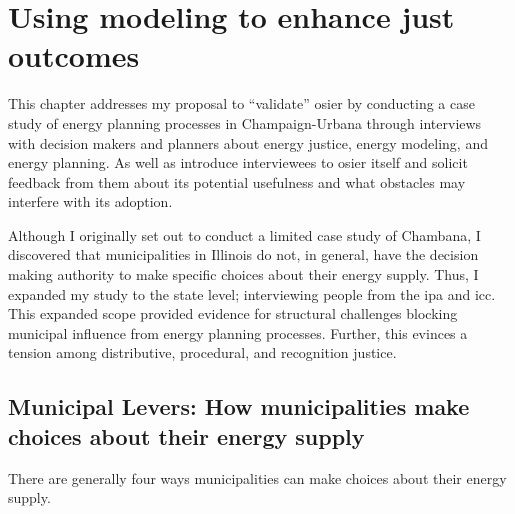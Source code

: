 





\chapter{Using modeling to enhance just outcomes}
\iffalse


This chapter addresses my proposal to ``validate'' \ac{osier} by conducting a
case study of energy planning processes in Champaign-Urbana through interviews
with decision makers and planners about energy justice, energy modeling, and
energy planning. As well as introduce interviewees to \ac{osier} itself and
solicit feedback from them about its potential usefulness and what obstacles may
interfere with its adoption. 

Although I originally set out to conduct a limited case study of Chambana, I
discovered that municipalities in Illinois do not, in general, have the decision
making authority to make specific choices about their energy supply.
Thus, I expanded my study to the state level; interviewing people from the
\ac{ipa} and \ac{icc}. This expanded scope provided evidence for structural
challenges blocking municipal influence from energy planning processes. Further,
this evinces a tension among distributive, procedural, and recognition justice.

\section{Municipal Levers: How municipalities make choices about their energy supply}
There are generally four ways municipalities can make choices about their energy supply.

